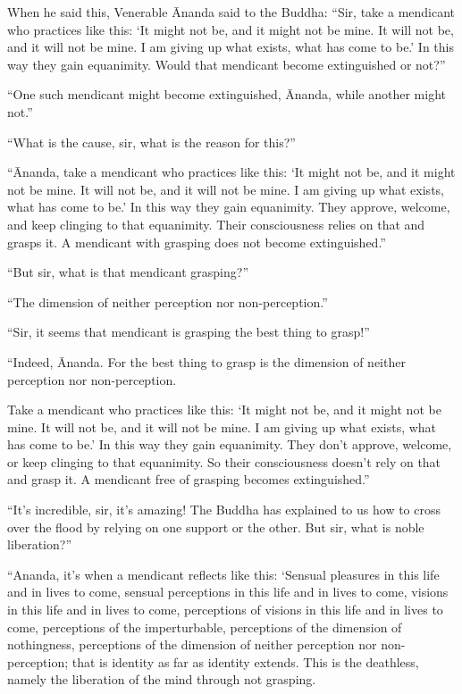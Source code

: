 \documentclass[12pt,openany]{book}%
\begin{document}
When he said this, Venerable Ānanda said to the Buddha: “Sir, take a mendicant who practices like this: ‘It might not be, and it might not be mine. It will not be, and it will not be mine. I am giving up what exists, what has come to be.’ In this way they gain equanimity. Would that mendicant become extinguished or not?” 

“One such mendicant might become extinguished, Ānanda, while another might not.” 

“What is the cause, sir, what is the reason for this?” 

“Ānanda, take a mendicant who practices like this: ‘It might not be, and it might not be mine. It will not be, and it will not be mine. I am giving up what exists, what has come to be.’ In this way they gain equanimity. They approve, welcome, and keep clinging to that equanimity. Their consciousness relies on that and grasps it. A mendicant with grasping does not become extinguished.” 

“But sir, what is that mendicant grasping?” 

“The dimension of neither perception nor non-perception.” 

“Sir, it seems that mendicant is grasping the best thing to grasp!” 

“Indeed, Ānanda. For the best thing to grasp is the dimension of neither perception nor non-perception. 

Take a mendicant who practices like this: ‘It might not be, and it might not be mine. It will not be, and it will not be mine. I am giving up what exists, what has come to be.’ In this way they gain equanimity. They don’t approve, welcome, or keep clinging to that equanimity. So their consciousness doesn’t rely on that and grasp it. A mendicant free of grasping becomes extinguished.” 

“It’s incredible, sir, it’s amazing! The Buddha has explained to us how to cross over the flood by relying on one support or the other. But sir, what is noble liberation?” 

“Ananda, it’s when a mendicant reflects like this: ‘Sensual pleasures in this life and in lives to come, sensual perceptions in this life and in lives to come, visions in this life and in lives to come, perceptions of visions in this life and in lives to come, perceptions of the imperturbable, perceptions of the dimension of nothingness, perceptions of the dimension of neither perception nor non-perception; that is identity as far as identity extends. This is the deathless, namely the liberation of the mind through not grasping. 
\end{document}
